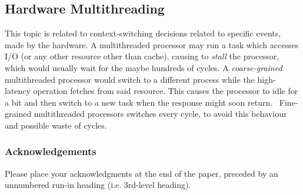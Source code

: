 \documentclass[runningheads]{llncs}
\begin{document}
\subsection{Hardware Multithreading}
This topic is related to context-switching decisions related to specific events, made by the hardware.
A multithreaded processor may run a task which accesses I/O (or any other resource other than cache), causing to \textit{stall} the processor, which would usually wait for the maybe hundreds of cycles. A \textit{coarse-grained} multithreaded processor would switch to a different process while the high-latency operation fetches from said resource. This causes the processor to idle for a bit and then switch to a new task when the response might soon return.~\cite{fedorova-phd}
Fine-grained multithreaded processors switches every cycle, to avoid this behaviour and possible waste of cycles.~\cite{fedorova-phd}

\subsubsection{Acknowledgements} Please place your acknowledgments at
the end of the paper, preceded by an unnumbered run-in heading (i.e.
3rd-level heading).

%
%

 
\newpage
\end{document}
